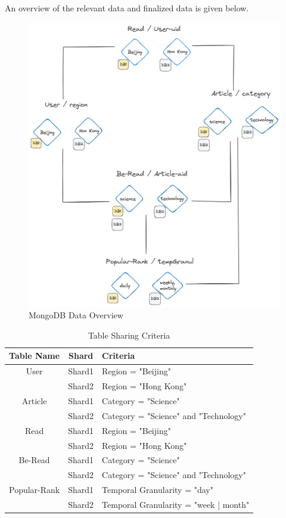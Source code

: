 \documentclass{report}
\begin{document}
    An overview of the relevant data and finalized data is given below. 
    \begin{figure}[h]
        \centering
        \includegraphics[width=\textwidth]{images/schema}
        \caption{MongoDB Data Overview}
        \label{fig:schema}
    \end{figure}

    \begin{table}[h]
        \centering
        \begin{tabularx}{\textwidth}{|c|c|X|}
            \hline
            \textbf{Table Name} & \textbf{Shard} & \textbf{Criteria} \\
            \hline
            User & Shard1 & Region = "Beijing" \\
            & Shard2 & Region = "Hong Kong" \\
            \hline
            Article & Shard1 & Category = "Science" \\
            & Shard2 & Category = "Science" and "Technology" \\
            \hline
            Read & Shard1 & Region = "Beijing" \\
            & Shard2 & Region = "Hong Kong" \\
            \hline
            Be-Read & Shard1 & Category = "Science" \\
            & Shard2 & Category = "Science" and "Technology" \\
            \hline
            Popular-Rank & Shard1 & Temporal Granularity = "day" \\
            & Shard2 & Temporal Granularity = "week | month" \\
            \hline
        \end{tabularx}
        \caption{Table Sharing Criteria}
        \label{tab:table-sharing}
    \end{table}
\end{document}
